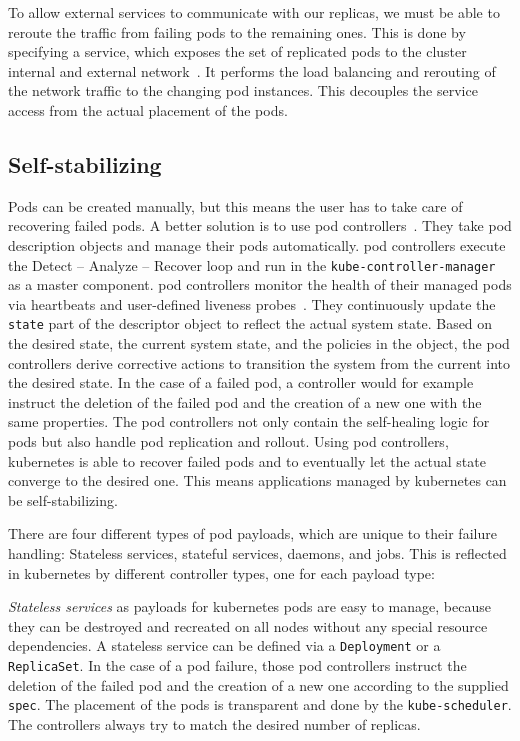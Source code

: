   To allow external services to communicate with our replicas, we must be able to reroute the traffic from failing pods to the remaining ones.
  This is done by specifying a \gls{service}, which exposes the set of replicated pods to the cluster internal and external network~\cite{kubernetesdoc}.
  It performs the load balancing and rerouting of the network traffic to the changing pod instances.
  This decouples the service access from the actual placement of the pods.

\subsection{Self-stabilizing}\label{sec:self-healing-kubernetes:self-stabilizing}
  Pods can be created manually, but this means the user has to take care of recovering failed pods.
  A better solution is to use \glspl{pod controller}~\cite{kubernetesdoc}.
  They take pod description objects and manage their pods automatically.
  \Glspl{pod controller} execute the Detect -- Analyze -- Recover loop and run in the \texttt{kube-controller-manager} as a master component.
  \Glspl{pod controller} monitor the health of their managed pods via heartbeats and user-defined liveness probes~\cite{kubernetesdoc}.
  They continuously update the \texttt{state} part of the descriptor object to reflect the actual system state.
  Based on the desired state, the current system state, and the policies in the object, the \glspl{pod controller} derive corrective actions to transition the system from the current into the desired state.
  In the case of a failed pod, a controller would for example instruct the deletion of the failed pod and the creation of a new one with the same properties.
  The \glspl{pod controller} not only contain the self-healing logic for pods but also handle pod replication and rollout.
  Using \glspl{pod controller}, \gls{kubernetes} is able to recover failed pods and to eventually let the actual state converge to the desired one.
  This means applications managed by \gls{kubernetes} can be self-stabilizing.

  There are four different types of pod payloads, which are unique to their failure handling:
  Stateless services, stateful services, daemons, and jobs.
  This is reflected in \gls{kubernetes} by different controller types, one for each payload type:

  \textit{Stateless services} as payloads for \gls{kubernetes} pods are easy to manage, because they can be destroyed and recreated on all nodes without any special resource dependencies.
  A stateless service can be defined via a \texttt{Deployment} or a \texttt{ReplicaSet}.
  In the case of a pod failure, those \glspl{pod controller} instruct the deletion of the failed pod and the creation of a new one according to the supplied \texttt{spec}.
  The placement of the pods is transparent and done by the \texttt{kube-scheduler}.
  The controllers always try to match the desired number of replicas.

